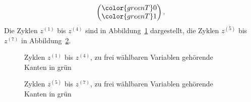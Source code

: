 \begin{loesung}
\[\begin{pmatrix}
\color{greenT} 0\\
\color{greenT} 1
\end{pmatrix}.
\]
Die Zyklen $z^{(1)}$ bis $z^{(4)}$ sind in Abbildung~\ref{10000028:z1bisz4}
dargestellt, die Zyklen $z^{(5)}$ bis $z^{(7)}$ in Abbildung~\ref{10000028:z5bisz7}.
\begin{figure}
\centering
{}
\caption{Zyklen $z^{(1)}$ bis $z^{(4)}$, zu frei wählbaren Variablen
gehörende Kanten in grün
\label{10000028:z1bisz4}}
\end{figure}
\begin{figure}
\centering
{}
\caption{Zyklen $z^{(5)}$ bis $z^{(7)}$, zu frei wählbaren Variablen
gehörende Kanten in grün
\label{10000028:z5bisz7}}
\end{figure}

\end{loesung}

